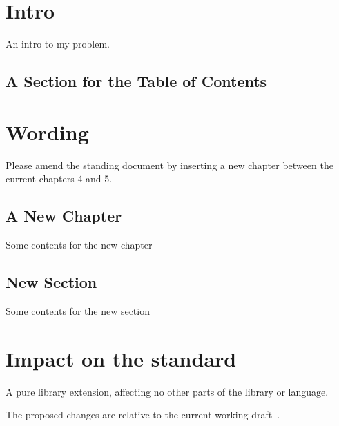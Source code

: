 \documentclass[a4paper,10pt,oneside,openany,final,article]{memoir}
\begin{document}
\tableofcontents*
\chapter{Intro}
An intro to my problem.
\section{A Section for the Table of Contents}
\chapter{Wording}
Please amend the standing document by inserting a new chapter between the current chapters 4 and 5.
\begin{@empty}
  \setcounter{scratchChapter}{\value{chapter}}
  \renewcommand\thechapter{\ucr}
  \renewcommand\thesection{\ucr.\arabic{section}}

  \chapter{A New Chapter}
  Some contents for the new chapter
  \section{New Section}
  Some contents for the new section

\setcounter{chapter}{\value{scratchChapter}}
\end{@empty}

\chapter{Impact on the standard}

A pure library extension, affecting no other parts of the library or language.

The proposed changes are relative to the current working draft~\cite{N4910}.

\renewcommand{\bibname}{References}



\nocite{viewmayb27:online}
\end{document}
